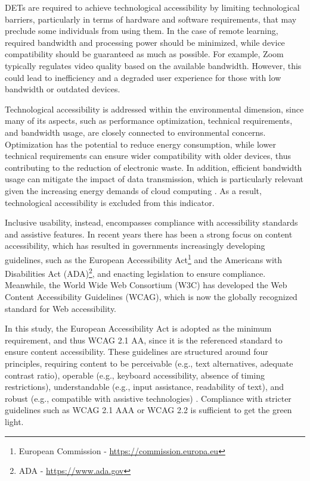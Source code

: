 DETs are required to achieve technological accessibility by limiting technological barriers, particularly in terms of hardware and software requirements, that may preclude some individuals from using them. In the case of remote learning, required bandwidth and processing power should be minimized, while device compatibility should be guaranteed as much as possible. For example, Zoom typically regulates video quality based on the available bandwidth. However, this could lead to inefficiency and a degraded user experience for those with low bandwidth or outdated devices.

Technological accessibility is addressed within the environmental dimension, since many of its aspects, such as performance optimization, technical requirements, and bandwidth usage, are closely connected to environmental concerns. Optimization has the potential to reduce energy consumption, while lower technical requirements can ensure wider compatibility with older devices, thus contributing to the reduction of electronic waste. In addition, efficient bandwidth usage can mitigate the impact of data transmission, which is particularly relevant given the increasing energy demands of cloud computing \cite{angeli_conceptualising_2022}.
As a result, technological accessibility is excluded from this indicator.

Inclusive usability, instead, encompasses compliance with accessibility standards and assistive features. In recent years there has been a strong focus on content accessibility, which has resulted in governments increasingly developing guidelines, such as the European Accessibility Act\footnote{European Commission - \href{https://commission.europa.eu/strategy-and-policy/policies/justice-and-fundamental-rights/disability/union-equality-strategy-rights-persons-disabilities-2021-2030/european-accessibility-act_en}{https://commission.europa.eu}} and the Americans with Disabilities Act (ADA)\footnote{ADA - \href{https://www.ada.gov/}{https://www.ada.gov}}, and enacting legislation to ensure compliance. Meanwhile, the World Wide Web Consortium (W3C) has developed the Web Content Accessibility Guidelines (WCAG), which is now the globally recognized standard for Web accessibility.

In this study, the European Accessibility Act is adopted as the minimum requirement, and thus WCAG 2.1 AA, since it is the referenced standard to ensure content accessibility. These guidelines are structured around four principles, requiring content to be perceivable (e.g., text alternatives, adequate contrast ratio), operable (e.g., keyboard accessibility, absence of timing restrictions), understandable (e.g., input assistance, readability of text), and robust (e.g., compatible with assistive technologies) \cite{acosta-vargas_challenges_2018}. Compliance with stricter guidelines such as WCAG 2.1 AAA or WCAG 2.2 is sufficient to get the green light.

